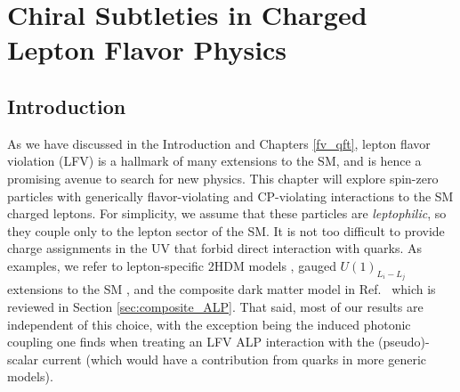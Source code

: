 \chapter{Chiral Subtleties in Charged Lepton Flavor Physics}
\label{lfv}







\section{Introduction}
As we have discussed in the Introduction and Chapters \ref{fv_qft}, lepton flavor violation (LFV) is a hallmark of many extensions to the SM, and is hence a promising avenue to search for new physics. This chapter will explore spin-zero particles with generically flavor-violating and CP-violating interactions to the SM charged leptons. For simplicity, we assume that these particles are {\it leptophilic}, so they couple only to the lepton sector of the SM. It is not too difficult to provide charge assignments in the UV that forbid direct interaction with quarks. As examples, we refer to lepton-specific 2HDM models \cite{Cao:2009as}, gauged $U(1)_{L_i-L_j}$ extensions to the SM \cite{Foot:1990mn,He:1990pn,He:1991qd,Heeck:2011wj}, and the composite dark matter model in Ref.~\cite{Davoudiasl:2017zws} which is reviewed in  Section \ref{sec:composite_ALP}. That said, most of our results are independent of this choice, with the exception being the induced photonic coupling one finds when treating an LFV ALP interaction with the (pseudo)-scalar current (which would have a contribution from quarks in more generic models).

